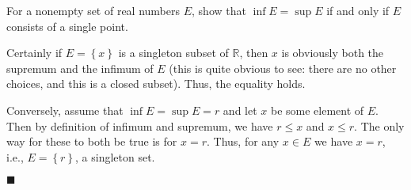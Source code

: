 \documentclass[12pt]{article}
\renewcommand{\qed}{\hfill$\blacksquare$}
\renewenvironment{proof}{\begin{addmargin}[1em]{0em}\begin{newproof}}{\end{newproof}\end{addmargin}\qed}
\newenvironment{problem}[2][Problem]{\begin{trivlist}
\item[\hskip \labelsep {\bfseries #1}\hskip \labelsep {\bfseries #2.}]}{\end{trivlist}}
\begin{document}
\begin{problem}{1.1.3}
For a nonempty set of real numbers $E$, show that $\inf E = \sup E$ if and only if $E$ consists of a single point.
\end{problem}
\begin{proof}
Certainly if $E=\left\{x\right\}$ is a singleton subset of $\mathbb{R}$, then $x$ is obviously both the supremum and the infimum of $E$ (this is quite obvious to see: there are no other choices, and this is a closed subset). Thus, the equality holds.

Conversely, assume that $\inf E = \sup E = r$ and let $x$ be some element of $E$. Then by definition of infimum and supremum, we have $r\leq x$ and $x\leq r$. The only way for these to both be true is for $x=r$. Thus, for any $x\in E$ we have $x=r$, i.e., $E = \left\{r\right\}$, a singleton set. 
\end{proof}
\end{document}
